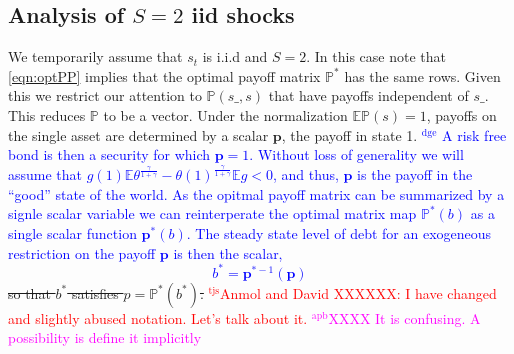 \documentclass[12pt]{article}
\newcommand{\dge}[1]{\textcolor{blue}{$^{\textrm{dge}}${#1}}}
\newcommand{\apb}[1]{\textcolor{magenta}{$^{\textrm{apb}}${#1}}}
\newcommand{\tjs}[1]{\textcolor{red}{$^{\textrm{tjs}}${#1}}}
\newcommand{\EE}{\mathbb E}
\begin{document}
%
%		
%	
%			

\subsection{Analysis of $S=2$ iid shocks} %



We temporarily assume that $s_t$ is i.i.d and  $S=2$.  In this case note that \eqref{eqn:optPP} implies that the optimal payoff matrix $\mathbb{P}^*$ has the same rows. Given this we restrict our attention to $\mathbb{P}(s\_,s)$ that have payoffs independent of $s\_$. This reduces $\mathbb{P}$ to be  a vector.
 Under the normalization  $\mathbb{E}\mathbb{P}(s)=1$, payoffs on the single asset are  determined by a  scalar $\bm{p}$, the payoff in state 1. \dge{  A risk free bond is then a security for which $\bm{p} = 1$.  Without loss of generality we will assume that $ g(1)\EE\theta^\frac{\gamma}{1+\gamma}-\theta(1)^\frac\gamma{1+\gamma} \mathbb{E}g <0$, and thus, $\bm p$ is the payoff in the ``good'' state of the world.  As the opitmal payoff matrix can be summarized by a signle scalar variable we can reinterperate the optimal matrix map $\mathbb P^*(b)$ as a single scalar function $\bm p^*(b)$.  The steady state level of debt for an exogeneous restriction on the payoff $\bm p$ is then the scalar, 
\begin{equation}
\label{eq-ss}
 b^* =  {\bm p}^{* -1}(\bm{p})
\end{equation}}
\st{so that $b^*$ satisfies $p={\mathbb P}^*(b^*)$.}
\tjs{Anmol and David XXXXXX: I have changed and slightly abused notation. Let's talk about it.}
\apb{XXXX It is confusing. A possibility is define it implicitly }
\end{document}
